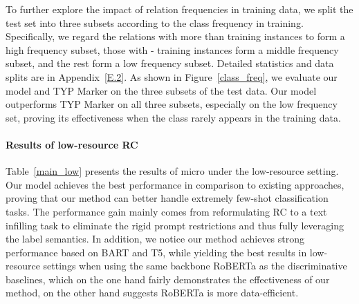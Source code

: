 \documentclass[11pt]{article}
\begin{document}
\begin{comment}
\begin{table*}[t!]
	\centering
\scalebox{0.9}{
		\begin{tabular}{lccccc}  
			\hline
			Dataset & Model & =8 & =16&=32&Full\\\hline
			\multirow{2}*{TACRED} & BART &29.7 (0.74) & 33.5 (0.68)&35.0 (0.66)&74.0 \\ 
			&T5&28.2 (1.31)&32.1 (1.40)&35.0 (0.85)& 74.1\\\hline
			\multirow{2}*{TACREV} & BART & 29.6 (0.59)&32.9 (0.74) &34.3 (0.43)&82.0\\ 
			&T5&27.9 (1.84)&31.7 (1.45)&34.6 (0.93)&82.9\\\hline
			\multirow{2}*{Re-TACRED} & BART &50.6 (2.70) &56.7 (0.79) &62.1 (1.82)&90.3\\ 
			&T5&52.4 (1.64)&57.3 (1.89)&62.3 (1.49)&\\\hline
		\end{tabular}
	}
	\caption{Results of micro  (\%) on different PLMs (BART and T5). We report mean
		(and standard deviation) performance over 5 different splits.}
	\label{t5}
\end{table*}
\end{comment}
To further explore the impact of relation frequencies in training data, we split the test set into three subsets according to the class frequency in training. Specifically, we regard the relations with more than  training instances to form a  high frequency subset, those with - training instances form a middle frequency subset, and the rest form a low frequency subset. Detailed statistics and data splits are in Appendix~\ref{E.2}. As shown in Figure~\ref{class_freq}, we evaluate our model and TYP Marker on the three subsets of the test data. Our model outperforms TYP Marker on all three subsets, especially on the low frequency set, proving its effectiveness when the class rarely appears in the training data.

\paragraph{Results of low-resource RC}
Table~\ref{main_low} presents the results of micro  under the low-resource setting. Our model achieves the best performance in comparison to existing approaches, proving that our method can better handle extremely few-shot classification tasks. The performance gain mainly comes from reformulating RC to a text infilling task to eliminate the rigid prompt restrictions and thus fully leveraging the label semantics. In addition, we notice our method achieves strong performance based on BART and T5, while yielding the best results in low-resource settings when using the same backbone RoBERTa as the discriminative baselines, which on the one hand fairly demonstrates the effectiveness of our method, on the other hand suggests RoBERTa is more data-efficient.
\end{document}
